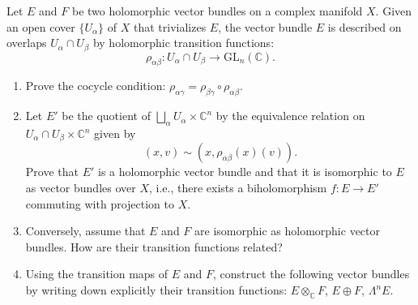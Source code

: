 \documentclass[12pt]{article}
\begin{document}
\begin{problem}{5}
    Let $E$ and $F$ be two holomorphic vector bundles on a complex manifold $X$. Given an open cover $\{ U_\alpha \}$ of $X$ that trivializes $E$, the vector bundle $E$ is described on overlaps $U_\alpha \cap U_\beta$ by holomorphic transition functions:
    \[
        \rho_{\alpha \beta} : U_\alpha \cap U_\beta \to \mathrm{GL}_n(\mathbb{C}).
    \]
    \begin{enumerate}
        \item Prove the cocycle condition: $\rho_{\alpha \gamma} = \rho_{\beta \gamma} \circ \rho_{\alpha \beta}$.
        \item Let $E'$ be the quotient of $\bigsqcup_\alpha U_\alpha \times \mathbb{C}^n$ by the equivalence relation on $U_\alpha \cap U_\beta \times \mathbb{C}^n$ given by
        \[
            (x, v) \sim (x, \rho_{\alpha \beta}(x)(v)).
        \]
        Prove that $E'$ is a holomorphic vector bundle and that it is isomorphic to $E$ as vector bundles over $X$, i.e., there exists a biholomorphism $f : E \to E'$ commuting with projection to $X$.
        
        \item Conversely, assume that $E$ and $F$ are isomorphic as holomorphic vector bundles. How are their transition functions related?
        
        \item Using the transition maps of $E$ and $F$, construct the following vector bundles by writing down explicitly their transition functions: $E \otimes_{\mathbb{C}} F$, $E \oplus F$, $\Lambda^n E$.
    \end{enumerate}
\end{problem}
\end{document}

